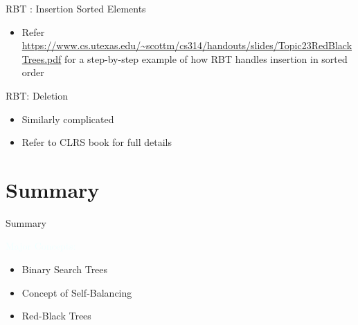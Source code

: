 \documentclass{beamer}
\newcommand{\tblue}[1]{{\Large {\textcolor{azure}{#1}}}}
\begin{document}
\begin{frame}{RBT : Insertion Sorted Elements}
    \begin{itemize}
        \item Refer \url{https://www.cs.utexas.edu/~scottm/cs314/handouts/slides/Topic23RedBlackTrees.pdf} for a step-by-step example of how RBT handles insertion in sorted order
    \end{itemize}
\end{frame}

\begin{frame}{RBT: Deletion}
    \begin{itemize}
        \item Similarly complicated 
        \item Refer to CLRS book for full details
    \end{itemize}
\end{frame}

\section{Summary}
\begin{frame}{Summary}

\tblue{Major Concepts:}
\begin{itemize}
\item Binary Search Trees
\item Concept of Self-Balancing
\item Red-Black Trees
\end{itemize}
\end{frame}
\end{document}
